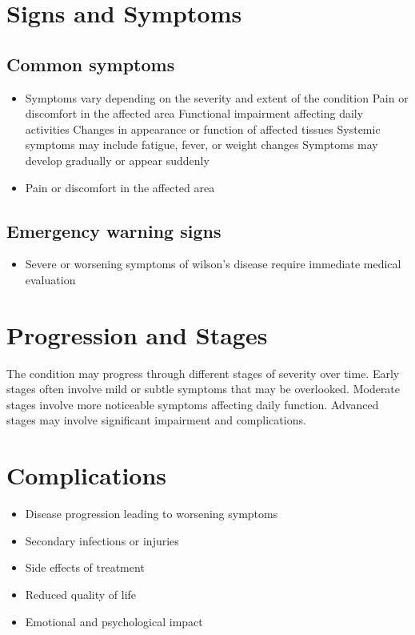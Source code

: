 \section{Signs and Symptoms}

\subsection{Common symptoms}
\begin{itemize}[noitemsep]
  \item Symptoms vary depending on the severity and extent of the condition Pain or discomfort in the affected area Functional impairment affecting daily activities Changes in appearance or function of affected tissues Systemic symptoms may include fatigue, fever, or weight changes Symptoms may develop gradually or appear suddenly
  \item Pain or discomfort in the affected area
  \end{itemize}

\subsection{Emergency warning signs}
\begin{itemize}[noitemsep]
  \item Severe or worsening symptoms of wilson's disease require immediate medical evaluation
\end{itemize}
\section{Progression and Stages}
The condition may progress through different stages of severity over time. Early stages often involve mild or subtle symptoms that may be overlooked. Moderate stages involve more noticeable symptoms affecting daily function. Advanced stages may involve significant impairment and complications.
\section{Complications}
\begin{itemize}[noitemsep]
  \item Disease progression leading to worsening symptoms
  \item Secondary infections or injuries
  \item Side effects of treatment
  \item Reduced quality of life
  \item Emotional and psychological impact
\end{itemize}
